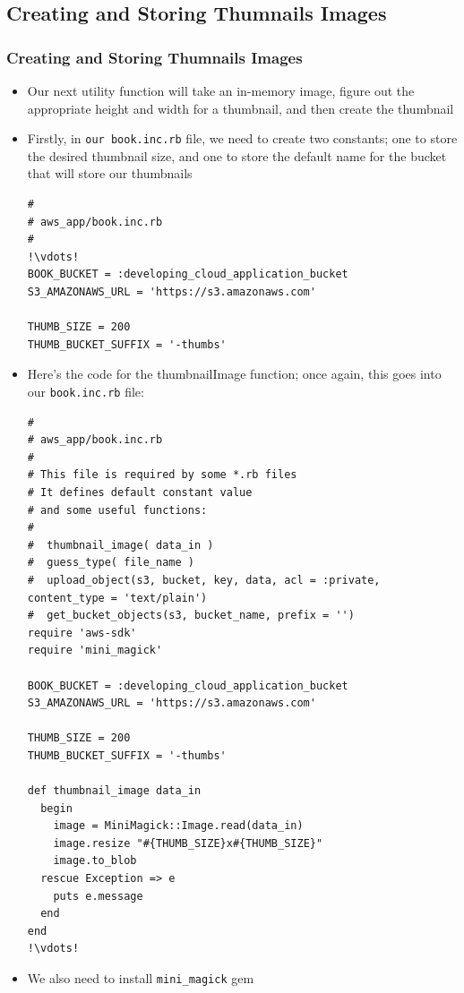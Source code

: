 \documentclass{beamer}
\begin{document}
\subsection{Creating and Storing Thumnails Images}
\begin{frame}
\frametitle{Creating and Storing Thumnails Images}
\begin{itemize}
\item Our next utility function will take an in-memory image, figure out the appropriate
height and width for a thumbnail, and then create the thumbnail
\item Firstly, in \texttt{our book.inc.rb} file, we need to create two constants; one to store the
desired thumbnail size, and one to store the default name for the bucket that will
store our thumbnails

\lstset{language=Ruby, style=eclipse}
\begin{lstlisting}[escapechar=!]
#
# aws_app/book.inc.rb
#
!\vdots!
BOOK_BUCKET = :developing_cloud_application_bucket
S3_AMAZONAWS_URL = 'https://s3.amazonaws.com'

THUMB_SIZE = 200
THUMB_BUCKET_SUFFIX = '-thumbs'
\end{lstlisting}

\item Here’s the code for the thumbnailImage function; once again, this goes into our \texttt{book.inc.rb} file:
\lstset{language=Ruby, style=eclipse}
\begin{lstlisting}[escapechar=!]
#
# aws_app/book.inc.rb
#
# This file is required by some *.rb files
# It defines default constant value
# and some useful functions:
#
#  thumbnail_image( data_in )
#  guess_type( file_name )
#  upload_object(s3, bucket, key, data, acl = :private, content_type = 'text/plain')
#  get_bucket_objects(s3, bucket_name, prefix = '')
require 'aws-sdk'
require 'mini_magick'

BOOK_BUCKET = :developing_cloud_application_bucket
S3_AMAZONAWS_URL = 'https://s3.amazonaws.com'

THUMB_SIZE = 200
THUMB_BUCKET_SUFFIX = '-thumbs'

def thumbnail_image data_in
  begin
    image = MiniMagick::Image.read(data_in)
    image.resize "#{THUMB_SIZE}x#{THUMB_SIZE}"
    image.to_blob
  rescue Exception => e
    puts e.message
  end
end
!\vdots!
\end{lstlisting}

\item We also need to install \texttt{mini\_magick} gem


\end{itemize}
\end{frame}
\end{document}
